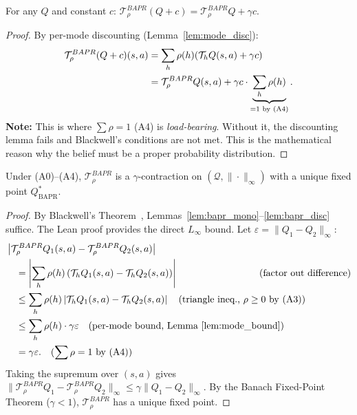 \begin{lemma}
    \label{lem:bapr_disc}
    For any $Q$ and constant $c$: $\mathcal{T}^{BAPR}_\rho(Q + c) = \mathcal{T}^{BAPR}_\rho Q + \gamma c$.
\end{lemma}
\begin{proof}
By per-mode discounting (Lemma~\ref{lem:mode_disc}):
\begin{align}
    \mathcal{T}^{BAPR}_\rho(Q+c)(s,a) &= \sum_h \rho(h)(\mathcal{T}_h Q(s,a) + \gamma c) \notag \\
    &= \mathcal{T}^{BAPR}_\rho Q(s,a) + \gamma c \cdot \underbrace{\sum_h \rho(h)}_{=1 \text{ by (A4)}}. \qedhere
\end{align}
\textbf{Note:} This is where $\sum \rho = 1$ (A4) is \emph{load-bearing}. Without it, the discounting lemma fails and Blackwell's conditions are not met. This is the mathematical reason why the belief must be a proper probability distribution.
\end{proof}

\begin{theorem}
    \label{thm:bapr_full}
    Under (A0)--(A4), $\mathcal{T}^{BAPR}_\rho$ is a $\gamma$-contraction on $(\mathcal{Q}, \|\cdot\|_\infty)$ with a unique fixed point $Q^*_{\text{BAPR}}$.
\end{theorem}
\begin{proof}
By Blackwell's Theorem~\cite{Blackwell1965DiscountedDP}, Lemmas~\ref{lem:bapr_mono}--\ref{lem:bapr_disc} suffice.
The Lean proof provides the direct $L_\infty$ bound. Let $\varepsilon = \|Q_1 - Q_2\|_\infty$:
\begin{align}
    &\left|\mathcal{T}^{BAPR}_\rho Q_1(s,a) - \mathcal{T}^{BAPR}_\rho Q_2(s,a)\right| \notag \\
    &\quad = \left|\sum_h \rho(h)\left(\mathcal{T}_h Q_1(s,a) - \mathcal{T}_h Q_2(s,a)\right)\right| \hspace{3cm} \text{(factor out difference)} \notag \\
    &\quad \leq \sum_h \rho(h) \left|\mathcal{T}_h Q_1(s,a) - \mathcal{T}_h Q_2(s,a)\right| \quad \text{(triangle ineq., $\rho \geq 0$ by (A3))} \notag \\
    &\quad \leq \sum_h \rho(h) \cdot \gamma\varepsilon \quad \text{(per-mode bound, Lemma~\ref{lem:mode_bound})} \notag \\
    &\quad = \gamma\varepsilon. \quad \text{($\sum \rho = 1$ by (A4))}
\end{align}
Taking the supremum over $(s,a)$ gives $\|\mathcal{T}^{BAPR}_\rho Q_1 - \mathcal{T}^{BAPR}_\rho Q_2\|_\infty \leq \gamma\|Q_1 - Q_2\|_\infty$.
By the Banach Fixed-Point Theorem ($\gamma < 1$), $\mathcal{T}^{BAPR}_\rho$ has a unique fixed point.
\end{proof}


